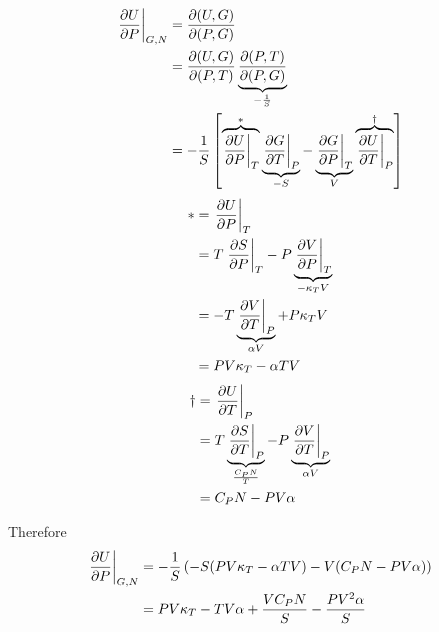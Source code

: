 \documentclass[a4paper,twoside]{article}
\begin{document}
\begin{problem}
    \begin{align}
        \eval{\pdv{U}{P}}_{G,N} &= \pdv{(U,G)}{(P,G)} \\
        &= \pdv{(U,G)}{(P,T)} \underbrace{\pdv{(P,T)}{(P,G)}}_{- \frac{1}{S}} \\
        &= - \frac{1}{S} \left[ \overbrace{\eval{\pdv{U}{P}}_{T}}^{\ast} \underbrace{\eval{\pdv{G}{T}}_{P}}_{-S} - \underbrace{\eval{\pdv{G}{P}}_{T}}_{V} \overbrace{\eval{\pdv{U}{T}}_{P}}^{\dagger} \right] \\
    \end{align}
    \begin{align}
        \ast &= \eval{\pdv{U}{P}}_{T} \\
        &= T \eval{\pdv{S}{P}}_{T} - P\underbrace{\eval{\pdv{V}{P}}_{T}}_{- \kappa_T V} \\
        &= - T \underbrace{\eval{\pdv{V}{T}}_{P}}_{\alpha V} + P\kappa_T V \\
        &= PV \kappa_T - \alpha TV
    \end{align}
    \begin{align}
        \dagger &= \eval{\pdv{U}{T}}_{P} \\
        &= T \underbrace{\eval{\pdv{S}{T}}_{P}}_{\frac{C_P N}{T}} - P \underbrace{\eval{\pdv{V}{T}}_{P}}_{\alpha V} \\
        &= C_P N - PV \alpha
    \end{align}

    Therefore
    \begin{align}
        \eval{\pdv{U}{P}}_{G,N} &= - \frac{1}{S} \left( -S(PV \kappa_T - \alpha TV) - V(C_P N - PV \alpha) \right) \\
        &= PV \kappa_T - TV \alpha + \frac{VC_P N}{S} - \frac{PV^2 \alpha}{S}
    \end{align}
\end{problem}
\end{document}
